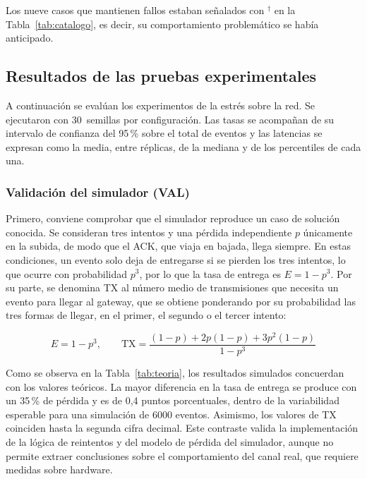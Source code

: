 Los nueve casos que mantienen fallos estaban señalados con $^{\dagger}$ en la Tabla~\ref{tab:catalogo}, es decir, su comportamiento problemático se había anticipado.

\subsection{Resultados de las pruebas experimentales}\label{sec:resultados-exp}

A continuación se evalúan los experimentos de la estrés sobre la red. Se ejecutaron con 30~semillas por configuración. Las tasas se acompañan de su intervalo de confianza del 95\,\% sobre el total de eventos y las latencias se expresan como la media, entre réplicas, de la mediana y de los percentiles de cada una.

\subsubsection{Validación del simulador (VAL)}

Primero, conviene comprobar que el simulador reproduce un caso de solución conocida. Se consideran tres intentos y una pérdida independiente $p$ únicamente en la subida, de modo que el ACK, que viaja en bajada, llega siempre. En estas condiciones, un evento solo deja de entregarse si se pierden los tres intentos, lo que ocurre con probabilidad $p^{3}$, por lo que la tasa de entrega es $E = 1 - p^{3}$. Por su parte, se denomina TX al número medio de transmisiones que necesita un evento para llegar al gateway, que se obtiene ponderando por su probabilidad las tres formas de llegar, en el primer, el segundo o el tercer intento:

\begin{equation}
E = 1 - p^{3}, \qquad \mathrm{TX} = \frac{(1-p) + 2p(1-p) + 3p^{2}(1-p)}{1 - p^{3}}
\end{equation}

Como se observa en la Tabla~\ref{tab:teoria}, los resultados simulados concuerdan con los valores teóricos. La mayor diferencia en la tasa de entrega se produce con un 35\,\% de pérdida y es de 0,4 puntos porcentuales, dentro de la variabilidad esperable para una simulación de 6000 eventos. Asimismo, los valores de TX coinciden hasta la segunda cifra decimal. Este contraste valida la implementación de la lógica de reintentos y del modelo de pérdida del simulador, aunque no permite extraer conclusiones sobre el comportamiento del canal real, que requiere medidas sobre hardware.

